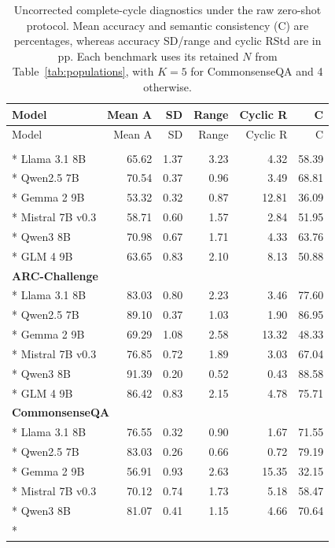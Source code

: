\begingroup\small\setlength{\tabcolsep}{4pt}
\begin{longtable}{lrrrrr}
\caption{Uncorrected complete-cycle diagnostics under the raw zero-shot protocol. Mean accuracy and semantic consistency (C) are percentages, whereas accuracy SD/range and cyclic RStd are in pp. Each benchmark uses its retained $N$ from Table~\ref{tab:populations}, with $K=5$ for CommonsenseQA and 4 otherwise.}\label{tab:permutation-metrics}\\
\toprule
Model & Mean A & SD & Range & Cyclic R & C\\\midrule
\endfirsthead
\toprule
Model & Mean A & SD & Range & Cyclic R & C\\\midrule\endhead
\bottomrule\endfoot
\multicolumn{6}{l}{\textbf{MMLU}}\\*
Llama 3.1 8B & 65.62 & 1.37 & 3.23 & 4.32 & 58.39\\*
Qwen2.5 7B & 70.54 & 0.37 & 0.96 & 3.49 & 68.81\\*
Gemma 2 9B & 53.32 & 0.32 & 0.87 & 12.81 & 36.09\\*
Mistral 7B v0.3 & 58.71 & 0.60 & 1.57 & 2.84 & 51.95\\*
Qwen3 8B & 70.98 & 0.67 & 1.71 & 4.33 & 63.76\\*
GLM 4 9B & 63.65 & 0.83 & 2.10 & 8.13 & 50.88\\
\multicolumn{6}{l}{\textbf{ARC-Challenge}}\\*
Llama 3.1 8B & 83.03 & 0.80 & 2.23 & 3.46 & 77.60\\*
Qwen2.5 7B & 89.10 & 0.37 & 1.03 & 1.90 & 86.95\\*
Gemma 2 9B & 69.29 & 1.08 & 2.58 & 13.32 & 48.33\\*
Mistral 7B v0.3 & 76.85 & 0.72 & 1.89 & 3.03 & 67.04\\*
Qwen3 8B & 91.39 & 0.20 & 0.52 & 0.43 & 88.58\\*
GLM 4 9B & 86.42 & 0.83 & 2.15 & 4.78 & 75.71\\
\multicolumn{6}{l}{\textbf{CommonsenseQA}}\\*
Llama 3.1 8B & 76.55 & 0.32 & 0.90 & 1.67 & 71.55\\*
Qwen2.5 7B & 83.03 & 0.26 & 0.66 & 0.72 & 79.19\\*
Gemma 2 9B & 56.91 & 0.93 & 2.63 & 15.35 & 32.15\\*
Mistral 7B v0.3 & 70.12 & 0.74 & 1.73 & 5.18 & 58.47\\*
Qwen3 8B & 81.07 & 0.41 & 1.15 & 4.66 & 70.64\\*

\end{longtable}
